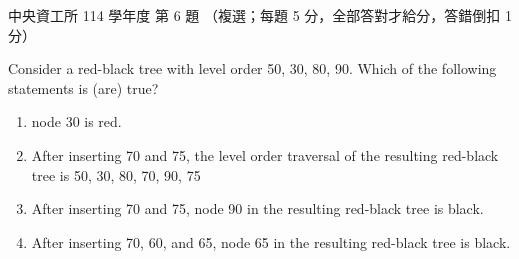 \begin{pastexam}[label={px:ncu-114-dsa-06}]{中央資工所 114 學年度 第 6 題}
（複選；每題 5 分，全部答對才給分，答錯倒扣 1 分）

Consider a red-black tree with level order 50, 30, 80, 90. Which of the following statements is (are)
true?
\begin{enumerate}[label=(\alph*)]
\item node 30 is red.
\item After inserting 70 and 75, the level order traversal of the resulting red-black tree is 50, 30,
80, 70, 90, 75
\item After inserting 70 and 75, node 90 in the resulting red-black tree is black.
\item After inserting 70, 60, and 65, node 65 in the resulting red-black tree is black.
\end{enumerate}
\end{pastexam}


